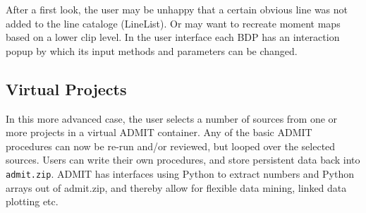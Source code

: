 \documentclass{report}
\begin{document}
After a first look, the user may be unhappy that a certain obvious line
was not added to the line cataloge (LineList). Or may want to recreate
moment maps based on a lower clip level. In the user interface each BDP has an
interaction popup by which its input methods and parameters can be changed.

\subsection{Virtual Projects}

In this more advanced case, the user selects a number of sources from one
or more projects in a virtual ADMIT container. Any of the basic ADMIT procedures
can now be re-run and/or reviewed, but looped over the selected sources.
Users can write their own procedures,
and store persistent data back into {\tt admit.zip}. ADMIT has interfaces
using Python to extract numbers and Python arrays out of admit.zip, and thereby
allow for flexible data mining, linked data plotting etc.

%
%
%
%
%  
%
%
%
%
\end{document}
